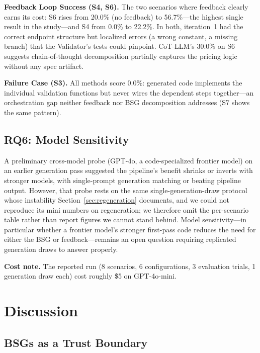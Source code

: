\documentclass[conference]{IEEEtran}
\begin{document}
\textbf{Feedback Loop Success (S4, S6).} The two scenarios where feedback clearly earns its cost: S6 rises from 20.0\% (no feedback) to 56.7\%---the highest single result in the study---and S4 from 0.0\% to 22.2\%. In both, iteration~1 had the correct endpoint structure but localized errors (a wrong constant, a missing branch) that the Validator's tests could pinpoint. CoT-LLM's 30.0\% on S6 suggests chain-of-thought decomposition partially captures the pricing logic without any spec artifact.

\textbf{Failure Case (S3).} All methods score 0.0\%: generated code implements the individual validation functions but never wires the dependent steps together---an orchestration gap neither feedback nor BSG decomposition addresses (S7 shows the same pattern).

\subsection{RQ6: Model Sensitivity}
\label{sec:model-comparison}

A preliminary cross-model probe (GPT-4o, a code-specialized frontier model) on an earlier generation pass suggested the pipeline's benefit shrinks or inverts with stronger models, with single-prompt generation matching or beating pipeline output. However, that probe rests on the same single-generation-draw protocol whose instability Section~\ref{sec:regeneration} documents, and we could not reproduce its mini numbers on regeneration; we therefore omit the per-scenario table rather than report figures we cannot stand behind. Model sensitivity---in particular whether a frontier model's stronger first-pass code reduces the need for either the BSG or feedback---remains an open question requiring replicated generation draws to answer properly.

\textbf{Cost note.} The reported run (8 scenarios, 6 configurations, 3 evaluation trials, 1 generation draw each) cost roughly \$5 on GPT-4o-mini.

\section{Discussion}
\label{sec:discussion}

\subsection{BSGs as a Trust Boundary}
\label{sec:bsg-trust}
\end{document}
